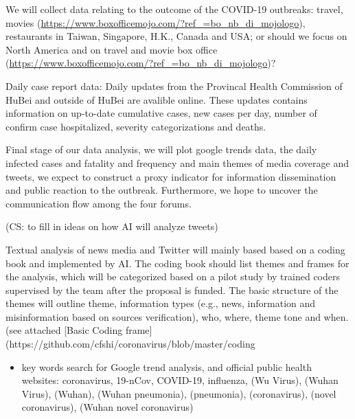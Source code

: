 We will collect data relating to the outcome of the COVID-19 outbreaks:   travel, movies (\url{https://www.boxofficemojo.com/?ref_=bo_nb_di_mojologo}), restaurants in Taiwan, Singapore, H.K., Canada and USA; or should we focus on North America and on travel and movie box office (\url{https://www.boxofficemojo.com/?ref_=bo_nb_di_mojologo})?

Daily case report data: Daily updates from the Provincal Health Commission of HuBei and outside of HuBei are avalible online. These updates contains information on up-to-date cumulative cases, new cases per day, number of confirm case hospitalized, severity categorizations and deaths.

Final stage of our data analysis,  we will plot google trends data, the daily infected cases and fatality and frequency and main themes of media coverage and tweets,  we expect to construct a proxy indicator for information dissemination and public reaction to the outbreak.  Furthermore, we hope to uncover the communication flow among the four forums.





(CS: to fill in ideas on how AI will analyze tweets) 

Textual analysis of news media and Twitter will mainly based based on a coding book and implemented by AI.  The coding book should list themes and frames for the analysis, which will be categorized based on a pilot study by trained coders supervised by the team after the proposal is funded.  The basic structure of the themes will outline theme, information types  (e.g., news, information and misinformation based on sources verification), who, where, theme tone and when.  (see  attached [Basic Coding frame](https://github.com/cfshi/coronavirus/blob/master/coding%

\begin{itemize}
\item{key words search for Google trend analysis, and official public health websites: coronavirus, 19-nCov, COVID-19, influenza, (Wu Virus), (Wuhan Virus), (Wuhan), (Wuhan pneumonia), (pneumonia), (coronavirus), (novel coronavirus), (Wuhan novel coronavirus)}
\end{itemize}

